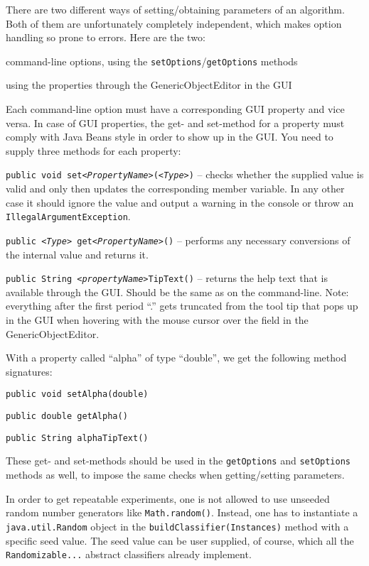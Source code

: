\label{classifier_parameters}
There are two different ways of setting/obtaining parameters of an algorithm.
Both of them are unfortunately completely independent, which makes option
handling so prone to errors. Here are the two:
\begin{tight_enumerate}
  \item command-line options, using the \texttt{setOptions}/\texttt{getOptions}
methods
  \item using the properties through the GenericObjectEditor in the GUI
\end{tight_enumerate}
Each command-line option must have a corresponding GUI property and vice versa.
In case of GUI properties, the get- and set-method for a property must
comply with Java Beans style in order to show up in the GUI. You need to supply
three methods for each property:
\begin{tight_itemize}
  \item \texttt{public void set\textit{<PropertyName>}(\textit{<Type>})} --
checks whether the supplied value is valid and only then updates the
corresponding member variable. In any other case it should ignore the value
and output a warning in the console or throw an
\texttt{IllegalArgumentException}.
  \item \texttt{public \textit{<Type>} get\textit{<PropertyName>}()} --
performs any necessary conversions of the internal value and returns it.
  \item \texttt{public String \textit{<propertyName>}TipText()} -- returns the
help text that is available through the GUI. Should be the same as on the
command-line. Note: everything after the first period ``.'' gets truncated from
the tool tip that pops up in the GUI when hovering with the mouse cursor over
the field in the GenericObjectEditor.
\end{tight_itemize}
With a property called ``alpha'' of type ``double'', we get the following
method signatures:
\begin{tight_itemize}
  \item \texttt{public void setAlpha(double)}
  \item \texttt{public double getAlpha()}
  \item \texttt{public String alphaTipText()}
\end{tight_itemize}
These get- and set-methods should be used in the \texttt{getOptions} and
\texttt{setOptions} methods as well, to impose the same checks when
getting/setting parameters.

In order to get repeatable experiments, one is not allowed to use unseeded
random number generators like \texttt{Math.random()}. Instead, one has to
instantiate a \texttt{java.util.Random} object in the
\texttt{buildClassifier(Instances)} method with a specific seed value. The seed
value can be user supplied, of course, which all the \texttt{Randomizable...}
abstract classifiers already implement.

